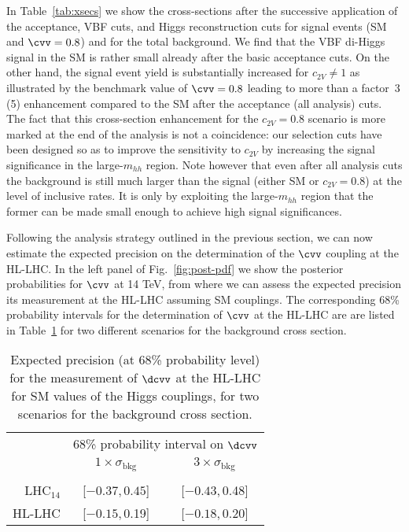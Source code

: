 In Table~\ref{tab:xsecs} we show the cross-sections after the
successive application of the acceptance, VBF cuts, and Higgs reconstruction cuts
for signal events (SM and  $\cvv=0.8$) and for
the total background. We find that the VBF di-Higgs signal in the SM is rather small
already after the basic acceptance cuts. On the other hand, the signal event
yield is substantially increased for $c_{2V}\ne 1$ as illustrated by the
benchmark value of $\cvv = 0.8$ leading to more than a factor~3\,(5) enhancement
compared to the SM after the acceptance (all analysis) cuts. The fact that this
cross-section enhancement for the $c_{2V} = 0.8$ scenario is more marked at the
end of the analysis is not a coincidence: our selection cuts have been designed
so as to improve the sensitivity to $c_{2V}$ by increasing the signal
significance in the large-$m_{hh}$ region.
Note however that even after
all analysis cuts the background is still much larger than the signal (either SM
or $c_{2V}=0.8$) at the level of inclusive rates. It is only by exploiting  the
large-$m_{hh}$ region that the former can be made small enough to achieve high
signal significances.


Following the analysis strategy outlined in the previous section,
we can now estimate the expected precision on the 
determination of the $\cvv$ coupling at the HL-LHC.
%
In the left panel of Fig.~\ref{fig:post-pdf} we show the
posterior probabilities for $\cvv$ at 14 TeV,
from where we can assess the expected precision  
       its measurement at the HL-LHC assuming SM couplings.
The corresponding 68\% probability intervals for the determination of $\cvv$ at the HL-LHC 
are are listed in Table~\ref{tab:resultsdcvv} for two different 
scenarios for the background cross section.
\begin{table}[h!]
\begin{center}
  \begin{tabular}{r|@{\hskip 0.15in}c @{\hskip 0.2in}c}
  	\toprule[1pt]
  	&\multicolumn{2}{c}{68\% probability interval on $\dcvv$}\\[0.1cm]
    & $1\times\sigma_\text{bkg}$&
    $3\times\sigma_\text{bkg}$ \\[0.1cm]
\hline
 & & \\[-0.3cm]
LHC$_{14}$ & [$-0.37$,\,$0.45$] & [$-0.43$,\,0.48] \\[0.2cm]
HL-LHC & [$-0.15$,\,0.19] & [$-0.18$,\,0.20]\\[0.2cm]
\bottomrule[1pt]
\end{tabular}
\end{center}
\vspace{-0.3cm}
\caption{\small Expected precision (at 68\% probability level) for
  the measurement of $\dcvv$ at the HL-LHC for
  SM values of the Higgs couplings, for two scenarios for the background cross section.
  \label{tab:resultsdcvv}
}
\end{table}

